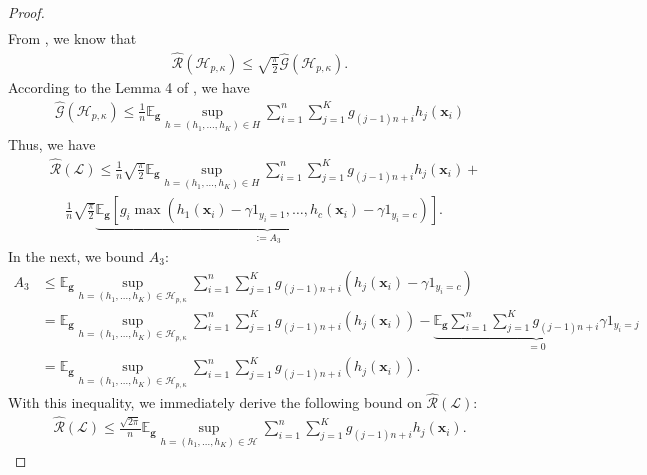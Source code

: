 \documentclass{article}
\begin{document}
\begin{proof}
\begin{align*}
  \end{align*}
  From \cite{ledoux2013probability}, we know that
  \begin{align*}
    \hat{\mathcal{R}}(\mathcal{H}_{p,\kappa})\leq \sqrt{\frac{\pi}{2}}\hat{\mathcal{G}}(\mathcal{H}_{p,\kappa}).
  \end{align*}
  According to the Lemma 4 of \cite{lei2015multi}, we have
  \begin{align*}
    \hat{\mathcal{G}}(\mathcal{H}_{p,\kappa})
    \leq \frac{1}{n}\mathbb{E}_{\bm g}\sup_{h=(h_1,\ldots,h_K)\in H}\sum_{i=1}^n\sum_{j=1}^Kg_{(j-1)n+i}h_j(\mathbf x_i)
  \end{align*}
  Thus, we have
  \begin{align*}
    &\hat{\mathcal{R}}(\mathcal{L}) \leq \frac{1}{n}\sqrt{\frac{\pi}{2}}\mathbb{E}_{\bm g}\sup_{h=(h_1,\ldots,h_K)\in H}\sum_{i=1}^n\sum_{j=1}^Kg_{(j-1)n+i}h_j(\mathbf x_i)+\\
    &~~~~~\frac{1}{n}\sqrt{\frac{\pi}{2}}\underbrace{\mathbb{E}_{\bm g}\left[g_i\max(h_1(\mathbf x_i)-\gamma 1_{y_i=1},\ldots,h_c(\mathbf x_i)-\gamma 1_{y_i=c})\right]}_{:=A_3}.
  \end{align*}
In the next, we bound $A_3$:
  \begin{align*}
    A_3&\leq\mathbb{E}_{\bm g}\sup_{h=(h_1,\ldots,h_K)\in \mathcal{H}_{p,\kappa}}\sum_{i=1}^n\sum_{j=1}^Kg_{(j-1)n+i}\left(h_j(\mathbf x_i)-\gamma 1_{y_i=c}\right)\\
       &=\mathbb{E}_{\bm g}\sup_{h=(h_1,\ldots,h_K)\in \mathcal{H}_{p,\kappa}}\sum_{i=1}^n\sum_{j=1}^Kg_{(j-1)n+i}\left(h_j(\mathbf x_i)\right)
       -\underbrace{\mathbb{E}_{\bm g}\sum_{i=1}^n\sum_{j=1}^Kg_{(j-1)n+i}\gamma 1_{y_i=j}}_{=0}\\
       &=\mathbb{E}_{\bm g}\sup_{h=(h_1,\ldots,h_K)\in \mathcal{H}_{p,\kappa}}\sum_{i=1}^n\sum_{j=1}^Kg_{(j-1)n+i}\left(h_j(\mathbf x_i)\right).
  \end{align*}
  With this inequality, we immediately derive the following bound on $\hat{\mathcal{R}}(\mathcal{L})$:
  \begin{align*}
    \hat{\mathcal{R}}(\mathcal{L})\leq \frac{\sqrt{2\pi}}{n}\mathbb{E}_{\mathbf g}\sup_{h=(h_1,\ldots,h_K)
  \in\mathcal{H}}\sum_{i=1}^n\sum_{j=1}^Kg_{(j-1)n+i}h_j(\mathbf x_i).
  \end{align*}
  \end{proof}
\end{document}
